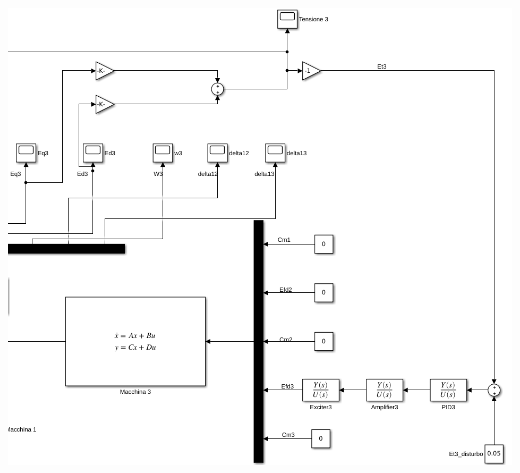 \documentclass[Lau,noexaminfo]{sapthesis}
\begin{document}
	\includegraphics[scale=0.5,angle=-90]{dettaglio_controllore_3}\newpage
\end{document}
